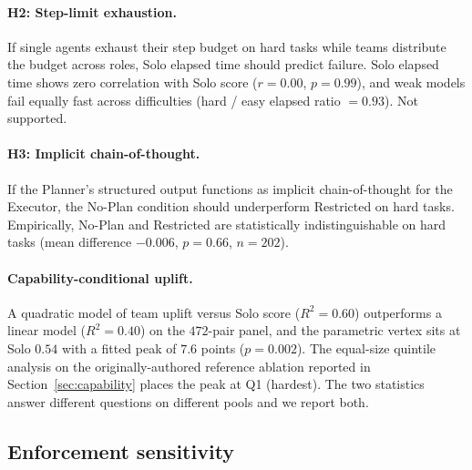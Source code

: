 \documentclass{article}
\begin{document}
\paragraph{H2: Step-limit exhaustion.}
If single agents exhaust their step budget on hard tasks while teams distribute the budget across roles, Solo elapsed time should predict failure. Solo elapsed time shows zero correlation with Solo score ($r = 0.00$, $p = 0.99$), and weak models fail equally fast across difficulties (hard / easy elapsed ratio $= 0.93$). Not supported.

\paragraph{H3: Implicit chain-of-thought.}
If the Planner's structured output functions as implicit chain-of-thought for the Executor, the No-Plan condition should underperform Restricted on hard tasks. Empirically, No-Plan and Restricted are statistically indistinguishable on hard tasks (mean difference $-0.006$, $p = 0.66$, $n = 202$).

\paragraph{Capability-conditional uplift.}
A quadratic model of team uplift versus Solo score ($R^2 = 0.60$) outperforms a linear model ($R^2 = 0.40$) on the $472$-pair panel, and the parametric vertex sits at Solo $0.54$ with a fitted peak of $7.6$ points ($p = 0.002$). The equal-size quintile analysis on the originally-authored reference ablation reported in Section~\ref{sec:capability} places the peak at Q1 (hardest). The two statistics answer different questions on different pools and we report both.

\subsection{Enforcement sensitivity}
\label{app:enforcement-sensitivity}
\end{document}
